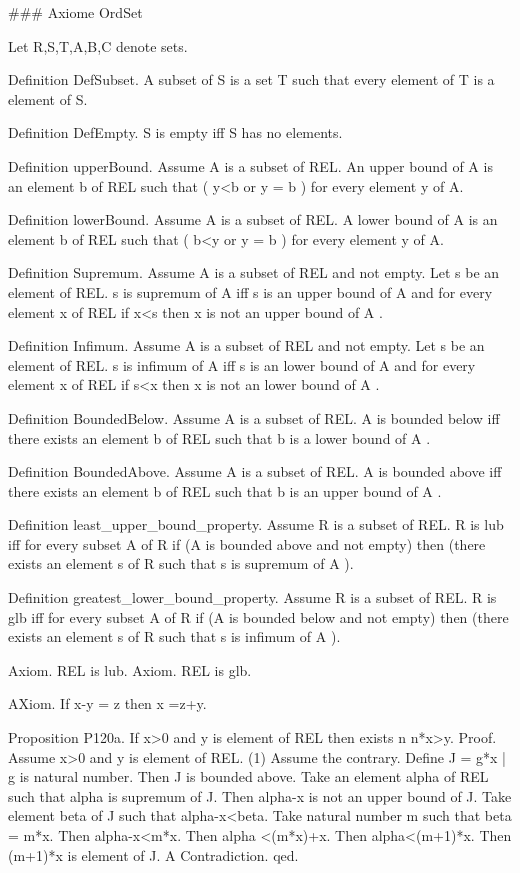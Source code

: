 \documentclass{article}
\newenvironment{forthel}{\begin{leftbar}}{\end{leftbar}}
\begin{document}
\begin{forthel}
### Axiome OrdSet

Let R,S,T,A,B,C denote sets.

Definition DefSubset.   A subset of S is a set T
such that every element of T is a element of S.

Definition DefEmpty.    S is empty iff S has no elements.


Definition upperBound.
Assume A is a subset of REL.
An upper bound of A is an element b of REL such that ( y<b or y = b ) for every element y of A.

Definition lowerBound.
Assume A is a subset of REL.
A lower bound of A is an element b of REL such that ( b<y or y = b ) for every element y of A.

Definition Supremum.
Assume A is a subset of REL and not empty.
Let s be an element of REL.
s is supremum of A  iff s is an upper bound of A 
and for every element x of REL if x<s then x is not an upper bound of A .

Definition Infimum.
Assume A is a subset of REL and not empty.
Let s be an element of REL.
s is infimum of A  iff s is an lower bound of A 
and for every element x of REL if s<x then x is not an lower bound of A .

Definition BoundedBelow.
Assume A is a subset of REL.
A is bounded below  iff 
there exists an element b of REL such that b is a lower bound of A .

Definition BoundedAbove.
Assume A is a subset of REL.
A is bounded above  iff 
there exists an element b of REL such that b is an upper bound of A .

Definition least_upper_bound_property.
Assume R is a subset of REL.
R is lub iff for every subset A of R
if (A is bounded above and not empty) then (there exists an element s of R such that s is supremum of A ).

Definition greatest_lower_bound_property.
Assume R is a subset of REL.
R is glb iff for every subset A of R
if (A is bounded below and not empty) then (there exists an element s of R such that s is infimum of A ).

Axiom. REL is lub.
Axiom. REL is glb.

AXiom. If x-y = z then x =z+y. 


Proposition P120a. If x>0 and y is element of REL then exists n  n*x>y.
Proof.
Assume x>0 and y is element of REL.
(1)	Assume the contrary.	
Define J = {g*x | g is natural number}.
Then J is bounded above.
Take an element alpha of REL such that alpha is supremum of J.
Then alpha-x is not an upper bound of J.
Take element beta of J such that alpha-x<beta.
Take natural number m such that beta = m*x.
Then alpha-x<m*x. Then alpha <(m*x)+x.	
Then alpha<(m+1)*x.
Then (m+1)*x is element of J.
A Contradiction.
qed.


\end{forthel}
\end{document}

